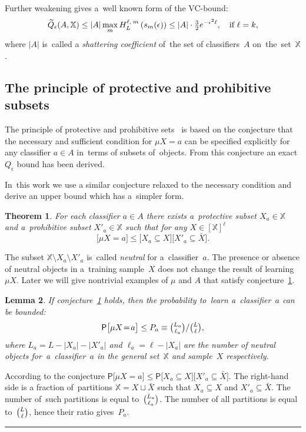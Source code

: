 \documentclass{article} %
\def\XX{\mathbb{X}}
\newcommand{\X}{\bar X}
\newcommand{\XXell}{[\XX]^\ell}
\def\CC_#1^#2{\tbinom{#1}{#2}}
\def\eps{\epsilon}
\providecommand{\Prob}{\mathsf{P}}
\def\Prbig[#1]{\Prob\bigl[#1\bigr]}
\newcommand{\hypergeom}[5]{{#1}_{#2}^{#4,\:#3}\left(#5\right)}
\newcommand{\Hyper}[4]{\hypergeom{H}{#1}{#2}{#3}{#4}}
\newtheorem{theorem}{Theorem}
\newtheorem{lemma}[theorem]{Lemma}
\newcommand{\qed}{\hfill\rule{7pt}{7pt}}
\newenvironment{proof}{\noindent{\bf Proof:}}{\qed\medskip}
\begin{document}
Further weakening gives a~well known form of the VC-bound:
\[
    \wtil Q_\eps(A, \XX)
    \leq
    |A| \max_m \Hyper{L}{m}{\ell}{s_m(\eps)}
    \leq
    |A| \cdot \tfrac32 e^{-\eps^2\ell},
    \quad
    \text{if } \ell=k,
\]
where $|A|$ is~called a \emph{shattering coefficient} of~the set of classifiers~$A$ on~the~set~$\XX$.

\subsection*{The principle of protective and prohibitive subsets}
\label{sec:ProtProh}

The principle of protective and prohibitive sets~\cite{voron10pria-eng}
is based on the conjecture that
the necessary and sufficient condition for $\mu X=a$ can be specified explicitly
for any classifier $a\in A$
in~terms of subsets of~objects.
From this conjecture an exact $Q_\eps$ bound has been derived.

In~this work we use a similar conjecture relaxed to the necessary condition
and derive an upper bound which has a~simpler form.

\begin{theorem}
\label{hyp:1}
    For each classifier $a\in A$  there exists
    a~\emph{protective subset} $X_a\in \XX$ and
    a~\emph{prohibitive subset} $X'_a\in \XX$ such that
    for any $X\in\XXell$
    \begin{equation}
    \label{eq:hyp1}
    	\bigl[ \mu X \!=\! a \bigr] \leq
        \bigl[X_a \!\subseteq\! X \bigr]
        \bigl[X'_a \!\subseteq\! \X \bigr].
    \end{equation}
\end{theorem}

The subset $\XX{\setminus} X_a{\setminus} X'_a$
is~called \emph{neutral} for a~classifier~$a$.
The presence or absence of neutral objects in a~training sample~$X$
does not change the result of learning~$\mu X$.
Later we will give nontrivial examples of $\mu$ and $A$ that satisfy conjecture~\ref{hyp:1}.

\begin{lemma}
\label{lem1}
    If conjecture~\ref{hyp:1} holds,
    then the probability to~learn a~classifier~$a$ can be bounded:
    \[
        \Prbig[ \mu X\!=\!a ]
        \leq
        P_a
        \equiv
        {\CC_{L_a}^{\ell_a}} / {\CC_{L}^{\ell}},
    \]
    where
    $L_a = L - |X_a| - |X'_a|$ and
    $\ell_a = \ell - |X_a|$
    are the number of neutral objects for~a~classifier~$a$ in the general set~$\XX$ and sample~$X$ respectively.
\end{lemma}
\begin{proof}
    According to the conjecture
    ${
        \Prbig[ \mu X\!=\!a ]
        \leq
        \Prob
        \bigl[  X_a\subseteq  X \bigr]
        \bigl[ X'_a\subseteq \X \bigr]
    }$.
    The right-hand side
    is a fraction of~partitions ${\XX=X\sqcup\X}$ such that
    ${X_a\subseteq  X}$ and ${X'_a\subseteq  \X}$.
    The number of~such partitions is equal to~$\CC_{L_a}^{\ell_a}$.
    The number of all partitions is equal to~$\CC_{L}^{\ell}$,
    hence their ratio gives~$P_a$.
\end{proof}
\end{document}
